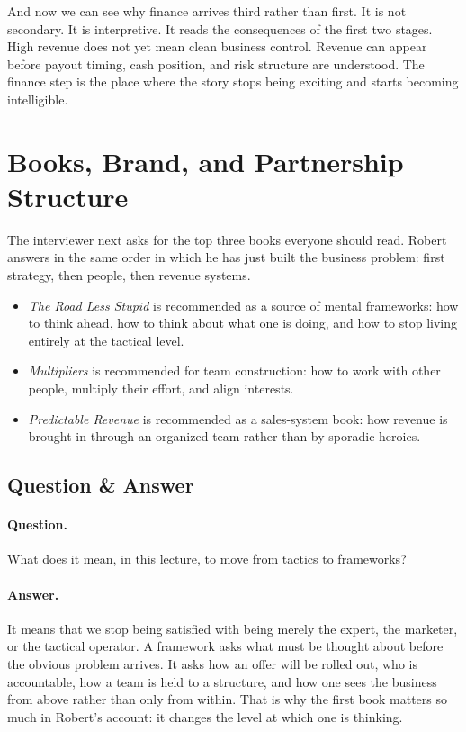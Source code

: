 And now we can see why finance arrives third rather than first. It is not secondary. It is interpretive. It reads the consequences of the first two stages. High revenue does not yet mean clean business control. Revenue can appear before payout timing, cash position, and risk structure are understood. The finance step is the place where the story stops being exciting and starts becoming intelligible.

\section{Books, Brand, and Partnership Structure}

The interviewer next asks for the top three books everyone should read. Robert answers in the same order in which he has just built the business problem: first strategy, then people, then revenue systems.

\begin{itemize}
\item \emph{The Road Less Stupid} is recommended as a source of mental frameworks: how to think ahead, how to think about what one is doing, and how to stop living entirely at the tactical level.
\item \emph{Multipliers} is recommended for team construction: how to work with other people, multiply their effort, and align interests.
\item \emph{Predictable Revenue} is recommended as a sales-system book: how revenue is brought in through an organized team rather than by sporadic heroics.
\end{itemize}

\subsection{Question \& Answer}

\paragraph{Question.}
What does it mean, in this lecture, to move from tactics to frameworks?

\paragraph{Answer.}
It means that we stop being satisfied with being merely the expert, the marketer, or the tactical operator. A framework asks what must be thought about before the obvious problem arrives. It asks how an offer will be rolled out, who is accountable, how a team is held to a structure, and how one sees the business from above rather than only from within. That is why the first book matters so much in Robert's account: it changes the level at which one is thinking.

